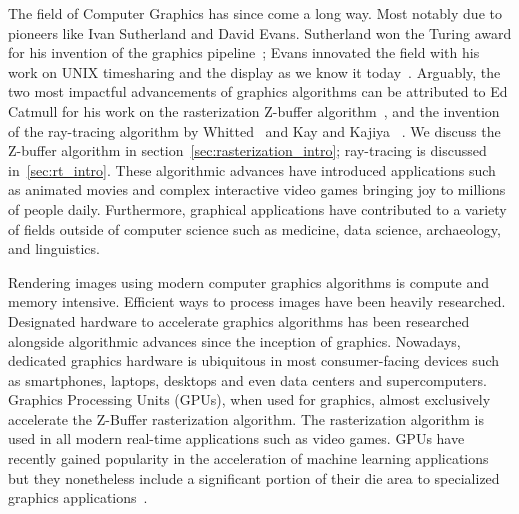 The field of Computer Graphics has since come a long way. Most notably due to pioneers like Ivan Sutherland and David Evans. Sutherland won the Turing award for his invention of the graphics pipeline~\cite{sutherland1989sproull}; Evans innovated the field with his work on UNIX timesharing and the display as we know it today~\cite{10.1016/0263-7855(87)80030-9}.
Arguably, the two most impactful advancements of graphics algorithms can be attributed to Ed Catmull for his work on the rasterization Z-buffer algorithm~\cite{10.5555/907242}, and the invention of the ray-tracing algorithm by Whitted~\cite{Whitted:1980:IIM:358876.358882} and Kay and Kajiya ~\cite{10.1145/15886.15916}. We discuss the Z-buffer algorithm in section~\autoref{sec:rasterization_intro}; ray-tracing is discussed in~\autoref{sec:rt_intro}.
These algorithmic advances have introduced applications such as animated movies and complex interactive video games bringing joy to millions of people daily. Furthermore, graphical applications have contributed to a variety of fields outside of computer science such as medicine, data science, archaeology, and linguistics.

Rendering images using modern computer graphics algorithms is compute and memory intensive. Efficient ways to process images have been heavily researched. Designated hardware to accelerate graphics algorithms has been researched alongside algorithmic advances since the inception of graphics. Nowadays, dedicated graphics hardware is ubiquitous in most consumer-facing devices such as smartphones, laptops, desktops and even data centers and supercomputers. Graphics Processing Units (GPUs), when used for graphics, almost exclusively accelerate the Z-Buffer rasterization algorithm. The rasterization algorithm is used in all modern real-time applications such as video games. GPUs have recently gained popularity in the acceleration of machine learning applications but they nonetheless include a significant portion of their die area to specialized graphics applications~\cite{NVIDIA-Turing}.

